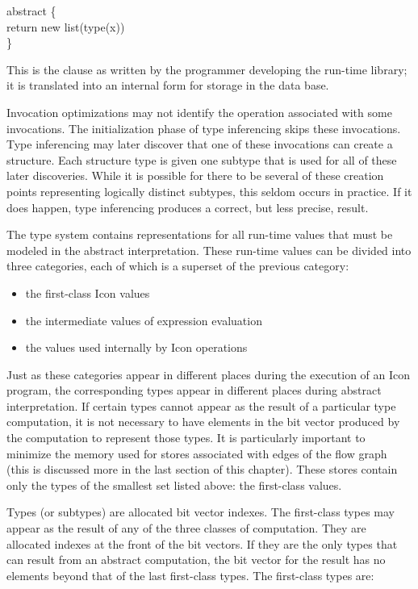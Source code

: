 \goodbreak
\begin{iconcode}
\>abstract \{\\
\>\>return new list(type(x))\\
\>\>\}\\
\end{iconcode}

This is the clause as written by the programmer developing the
run-time library; it is translated into an internal form for storage
in the data base.

Invocation optimizations may not identify the operation associated
with some invocations. The initialization phase of type inferencing
skips these invocations. Type inferencing may later discover that one
of these invocations can create a structure. Each structure type is
given one subtype that is used for all of these later
discoveries. While it is possible for there to be several of these
creation points representing logically distinct subtypes, this seldom
occurs in practice. If it does happen, type inferencing produces a
correct, but less precise, result.

The type system contains representations for all run-time values that
must be modeled in the abstract interpretation.  These run-time values
can be divided into three categories, each of which is a superset of
the previous category:

\liststyleLxxii
\begin{itemize}
\item 
the first-class Icon values 
\item 
the intermediate values of expression evaluation 
\item 
the values used internally by Icon operations 
\end{itemize}

Just as these categories appear in different places during the
execution of an Icon program, the corresponding types appear in
different places during abstract interpretation. If certain types
cannot appear as the result of a particular type computation, it is
not necessary to have elements in the bit vector produced by the
computation to represent those types. It is particularly important to
minimize the memory used for stores associated with edges of the flow
graph (this is discussed more in the last section of this
chapter). These stores contain only the types of the smallest set
listed above: the first-class values.

Types (or subtypes) are allocated bit vector indexes. The first-class
types may appear as the result of any of the three classes of
computation. They are allocated indexes at the front of the bit
vectors. If they are the only types that can result from an abstract
computation, the bit vector for the result has no elements beyond that
of the last first-class types. The first-class types are:

